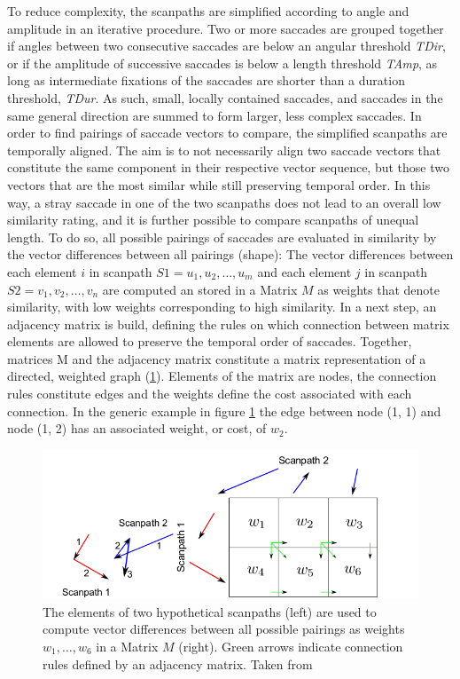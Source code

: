 \documentclass[a4paper, 12pt]{scrreprt}
\begin{document}
To reduce complexity, the scanpaths are simplified according to angle and amplitude in an iterative procedure. Two or more saccades are grouped together if angles between two consecutive saccades are below an angular threshold \textit{TDir}, or if the amplitude of successive saccades is below a length threshold \textit{TAmp}, as long as intermediate fixations of the saccades are shorter than a duration threshold, \textit{TDur}. As such, small, locally contained saccades, and saccades in the same general direction are summed to form larger, less complex saccades. \newline
In order to find pairings of saccade vectors to compare, the simplified scanpaths are temporally aligned. The aim is to not necessarily align two saccade vectors that constitute the same component in  their respective vector sequence, but those two vectors that are the most similar while still preserving temporal order. In this way, a stray saccade in one of the two scanpaths does not lead to an overall low similarity rating, and it is further possible to compare scanpaths of unequal length.  To do so, all possible pairings of saccades are evaluated in similarity by the vector differences between all pairings (shape): The vector differences between each element $i$ in scanpath $S1 = {u_1, u_2, \ldots, u_m}$ and each element $j$ in scanpath $S2 = {v_1, v_2, \ldots, v_n}$ are computed an stored in a Matrix $M$ as weights that denote similarity, with low weights corresponding to high similarity. In a next step, an adjacency matrix is build, defining the rules on which connection between matrix elements are allowed to preserve the temporal order of saccades. Together, matrices M and the adjacency matrix constitute a matrix representation of a directed, weighted graph (\ref{fig:directedgraph}). Elements of the matrix are nodes, the connection rules constitute edges and the weights define the cost associated with each connection. 
In the generic example in figure \ref{fig:directedgraph} the edge between node (1, 1) and node (1, 2) has an associated weight, or cost, of $w_2$. 


\begin{figure}
	\includegraphics[scale=0.4]{img/weightedgraph.png}
	\caption[Scanpath alignment as a shortest-path-problem]
	{\small{The elements of two hypothetical scanpaths (left) are used to compute vector differences between all possible pairings as weights $w_1, \ldots, w_6$ in a Matrix $M$ (right). Green arrows indicate connection rules defined by an adjacency matrix. Taken from \textcite{jarodzka2010vector}}}
	\label{fig:directedgraph}
\end{figure}
\end{document}
